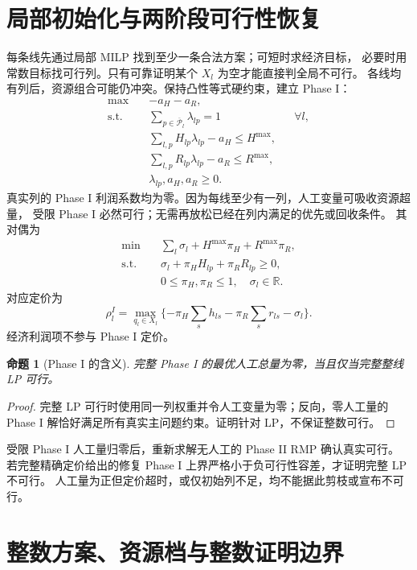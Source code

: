 \documentclass[UTF8,a4paper,11pt]{ctexart}
\newtheorem{proposition}{命题}
\begin{document}
\section{局部初始化与两阶段可行性恢复}
每条线先通过局部 MILP 找到至少一条合法方案；可短时求经济目标，
必要时用常数目标找可行列。只有可靠证明某个 $X_l$ 为空才能直接判全局不可行。
各线均有列后，资源组合可能仍冲突。保持凸性等式硬约束，建立 Phase I：
\begin{align}
\max\quad &-a_H-a_R,\\
\text{s.t.}\quad &\sum_{p\in\overline{\mathcal P}_l}\lambda_{lp}=1 &&\forall l,\\
&\sum_{l,p}H_{lp}\lambda_{lp}-a_H\leq H^{\max},\\
&\sum_{l,p}R_{lp}\lambda_{lp}-a_R\leq R^{\max},\\
&\lambda_{lp},a_H,a_R\geq0.
\end{align}
真实列的 Phase I 利润系数均为零。因为每线至少有一列，人工变量可吸收资源超量，
受限 Phase I 必然可行；无需再放松已经在列内满足的优先或回收条件。
其对偶为
\begin{equation}
\begin{aligned}
\min\quad &\sum_l\sigma_l+H^{\max}\pi_H+R^{\max}\pi_R,\\
\text{s.t.}\quad &\sigma_l+\pi_H H_{lp}+\pi_R R_{lp}\geq0,\\
&0\leq\pi_H,\pi_R\leq1,\quad\sigma_l\in\mathbb R.
\end{aligned}
\end{equation}
对应定价为
\begin{equation}
\rho_l^I=\max_{q_l\in X_l}\{-\pi_H\sum_s h_{ls}-\pi_R\sum_s r_{ls}-\sigma_l\}.
\end{equation}
经济利润项不参与 Phase I 定价。

\begin{proposition}[Phase I 的含义]
完整 Phase I 的最优人工总量为零，当且仅当完整整线 LP 可行。
\end{proposition}
\begin{proof}
完整 LP 可行时使用同一列权重并令人工变量为零；反向，零人工量的
Phase I 解恰好满足所有真实主问题约束。证明针对 LP，不保证整数可行。
\end{proof}
受限 Phase I 人工量归零后，重新求解无人工的 Phase II RMP 确认真实可行。
若完整精确定价给出的修复 Phase I 上界严格小于负可行性容差，才证明完整 LP 不可行。
人工量为正但定价超时，或仅初始列不足，均不能据此剪枝或宣布不可行。

\section{整数方案、资源档与整数证明边界}
\end{document}

